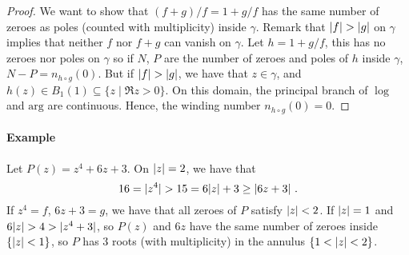 \begin{proof}
  We want to show that $(f + g)/f = 1 + g/f$ has the same number of zeroes as poles (counted with multiplicity) inside $\gamma$.
Remark that $\lvert f\rvert > \lvert g\rvert$ on $\gamma$ implies that neither $f$ nor $f + g$ can vanish on $\gamma$.
Let $h = 1 + g / f$, this has no zeroes nor poles on $\gamma$ so if $N$, $P$ are the number of zeroes and poles of $h$ inside $\gamma$, $N-P = n_{h \circ g}(0)$.
But if $\lvert f\rvert > \lvert g\rvert$, we have that $z \in \gamma$, and $h(z) \in B_1(1) \subseteq \{ z \mid \Re z > 0 \}$.
On this domain, the principal branch of $\log$ and $\mathrm{arg}$ are continuous.
Hence, the winding number $n_{h \circ g}(0) = 0$.
\end{proof}

\paragraph{Example}
Let $P(z) = z^4 + 6z + 3$. On $\lvert z\rvert = 2$, we have that
\[
16 = \lvert z^4\rvert > 15 = 6\lvert z\rvert + 3 \geq \lvert6z + 3\rvert \ \text{.}
\]
If $z^4 = f$, $6z + 3 = g$, we have that all zeroes of $P$ satisfy $\lvert z\rvert < 2$.
If $\lvert z\rvert = 1$ and $6 \lvert z\rvert > 4 > \lvert z^4 + 3\rvert$, so $P(z)$ and $6z$ have the same number of zeroes inside $\{ \lvert z\rvert < 1 \}$, so $P$ has $3$ roots (with multiplicity) in the annulus $\{ 1 < \lvert z\rvert < 2 \}$.


